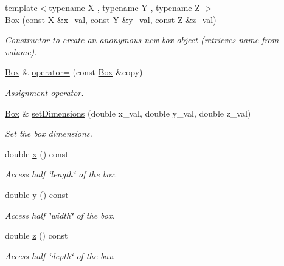 \begin{DoxyCompactItemize}
{\footnotesize template$<$typename X , typename Y , typename Z $>$ }\\\hyperlink{class_d_d4hep_1_1_geometry_1_1_box_ae3862d860e87b005f22b62e9f82d5b51}{Box} (const X \&x\_\-val, const Y \&y\_\-val, const Z \&z\_\-val)
\begin{DoxyCompactList}\small\item\em Constructor to create an anonymous new box object (retrieves name from volume). \item\end{DoxyCompactList}\item 
\hyperlink{class_d_d4hep_1_1_geometry_1_1_box}{Box} \& \hyperlink{class_d_d4hep_1_1_geometry_1_1_box_a25b695cf830ce545da5718fef3505fd3}{operator=} (const \hyperlink{class_d_d4hep_1_1_geometry_1_1_box}{Box} \&copy)
\begin{DoxyCompactList}\small\item\em Assignment operator. \item\end{DoxyCompactList}\item 
\hyperlink{class_d_d4hep_1_1_geometry_1_1_box}{Box} \& \hyperlink{class_d_d4hep_1_1_geometry_1_1_box_aa747479d055c62966ac21ac49355a2dc}{setDimensions} (double x\_\-val, double y\_\-val, double z\_\-val)
\begin{DoxyCompactList}\small\item\em Set the box dimensions. \item\end{DoxyCompactList}\item 
double \hyperlink{class_d_d4hep_1_1_geometry_1_1_box_ae9b52725587d2f97173045ec1c53f83f}{x} () const 
\begin{DoxyCompactList}\small\item\em Access half \char`\"{}length\char`\"{} of the box. \item\end{DoxyCompactList}\item 
double \hyperlink{class_d_d4hep_1_1_geometry_1_1_box_a98e1d55c9bab25b05edeebf18f227325}{y} () const 
\begin{DoxyCompactList}\small\item\em Access half \char`\"{}width\char`\"{} of the box. \item\end{DoxyCompactList}\item 
double \hyperlink{class_d_d4hep_1_1_geometry_1_1_box_a6fa4743099a63dcd03f200aafee7253e}{z} () const 
\begin{DoxyCompactList}\small\item\em Access half \char`\"{}depth\char`\"{} of the box. \item\end{DoxyCompactList}\end{DoxyCompactItemize}
